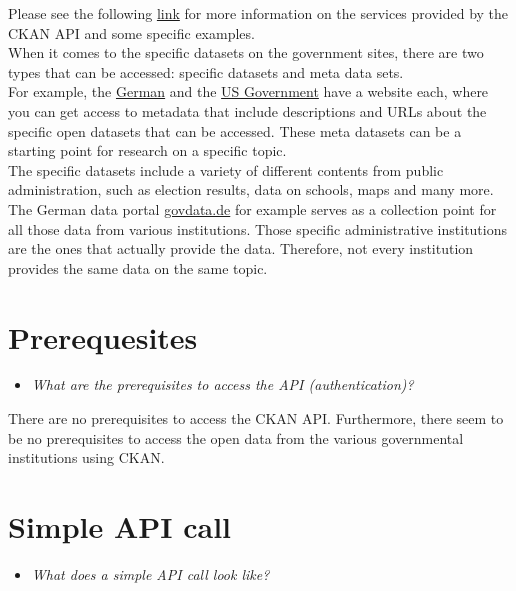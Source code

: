 \documentclass[
]{book}
\providecommand{\tightlist}{%
  \setlength{\itemsep}{0pt}\setlength{\parskip}{0pt}}
\begin{document}
Please see the following \href{https://docs.ckan.org/en/2.8/api/index.html}{link} for more information on the services provided by the CKAN API and some specific examples.\\
When it comes to the specific datasets on the government sites, there are two types that can be accessed: specific datasets and meta data sets.\\
For example, the \href{https://www.govdata.de/impressum}{German} and the \href{https://www.gsa.gov/about-us/organization/federal-acquisition-service/technology-transformation-services}{US Government} have a website each, where you can get access to metadata that include descriptions and URLs about the specific open datasets that can be accessed. These meta datasets can be a starting point for research on a specific topic.\\
The specific datasets include a variety of different contents from public administration, such as election results, data on schools, maps and many more. The German data portal \href{https://www.govdata.de/impressum}{govdata.de} for example serves as a collection point for all those data from various institutions. Those specific administrative institutions are the ones that actually provide the data. Therefore, not every institution provides the same data on the same topic.

\hypertarget{prerequesites-9}{%
\section{Prerequesites}\label{prerequesites-9}}

\begin{itemize}
\tightlist
\item
  \emph{What are the prerequisites to access the API (authentication)? }
\end{itemize}

There are no prerequisites to access the CKAN API. Furthermore, there seem to be no prerequisites to access the open data from the various governmental institutions using CKAN.

\hypertarget{simple-api-call-9}{%
\section{Simple API call}\label{simple-api-call-9}}

\begin{itemize}
\tightlist
\item
  \emph{What does a simple API call look like?}
\end{itemize}
\end{document}
